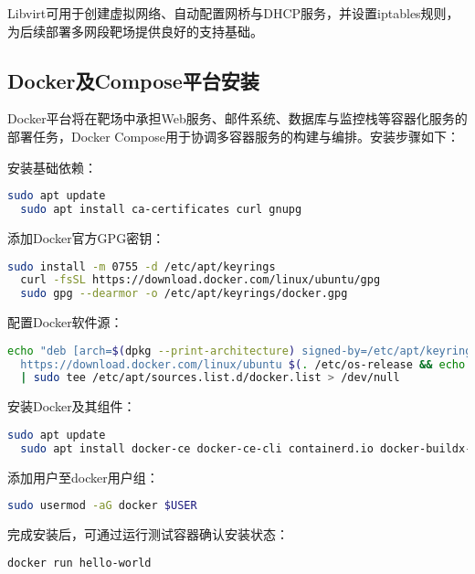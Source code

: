 \documentclass[lang=cn,10pt]{elegantbook}
\begin{document}
Libvirt可用于创建虚拟网络、自动配置网桥与DHCP服务，并设置iptables规则，为后续部署多网段靶场提供良好的支持基础。

\subsection{Docker及Compose平台安装}

Docker平台将在靶场中承担Web服务、邮件系统、数据库与监控栈等容器化服务的部署任务，Docker Compose用于协调多容器服务的构建与编排。安装步骤如下：

安装基础依赖：

\begin{lstlisting}[language=bash]
  sudo apt update
  sudo apt install ca-certificates curl gnupg
\end{lstlisting}

添加Docker官方GPG密钥：

\begin{lstlisting}[language=bash]
  sudo install -m 0755 -d /etc/apt/keyrings
  curl -fsSL https://download.docker.com/linux/ubuntu/gpg
  sudo gpg --dearmor -o /etc/apt/keyrings/docker.gpg
\end{lstlisting}

配置Docker软件源：

\begin{lstlisting}[language=bash]
  echo "deb [arch=$(dpkg --print-architecture) signed-by=/etc/apt/keyrings/docker.gpg]
  https://download.docker.com/linux/ubuntu $(. /etc/os-release && echo "$VERSION_CODENAME") stable"
  | sudo tee /etc/apt/sources.list.d/docker.list > /dev/null
\end{lstlisting}

安装Docker及其组件：

\begin{lstlisting}[language=bash]
  sudo apt update
  sudo apt install docker-ce docker-ce-cli containerd.io docker-buildx-plugin docker-compose-plugin
\end{lstlisting}

添加用户至docker用户组：

\begin{lstlisting}[language=bash]
  sudo usermod -aG docker $USER
\end{lstlisting}

完成安装后，可通过运行测试容器确认安装状态：

\begin{lstlisting}[language=bash]
  docker run hello-world
\end{lstlisting}
\end{document}
